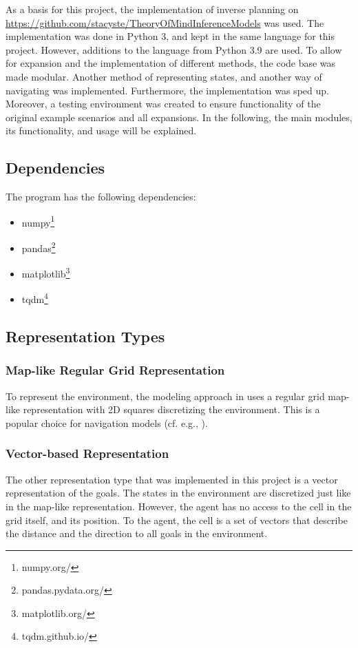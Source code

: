 As a basis for this project, the implementation of inverse planning on \url{https://github.com/stacyste/TheoryOfMindInferenceModels} was used.
The implementation was done in Python 3, and kept in the same language for this project. However, additions to the language from Python 3.9 are used.
To allow for expansion and the implementation of different methods, the code base was made modular.
Another method of representing states, and another way of navigating was implemented.
Furthermore, the implementation was sped up.
Moreover, a testing environment was created to ensure functionality of the original example scenarios and all expansions.
In the following, the main modules, its functionality, and usage will be explained.

\subsection{Dependencies}
The program has the following dependencies:
\begin{itemize}
	\setlength\itemsep{0em}
	\item numpy\footnote{numpy.org/}
	\item pandas\footnote{pandas.pydata.org/}
	\item matplotlib\footnote{matplotlib.org/}
	\item tqdm\footnote{tqdm.github.io/}
\end{itemize}

\subsection{Representation Types}
\subsubsection{Map-like Regular Grid Representation}
To represent the environment, the modeling approach in  uses a regular grid map-like representation with 2D squares discretizing the environment.
This is a popular choice for navigation models (cf. e.g., ).

\subsubsection{Vector-based Representation}
The other representation type that was implemented in this project is a vector representation of the goals.
The states in the environment are discretized just like in the map-like representation. However, the agent has no access to the cell in the grid itself, and its position.
To the agent, the cell is a set of vectors that describe the distance and the direction to all goals in the environment.


